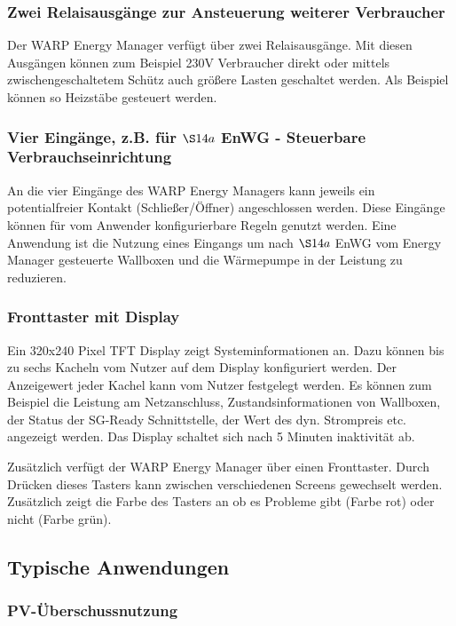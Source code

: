 \documentclass[a4paper,10pt]{article}
\begin{document}
\begin{multicols*}{2}
	\subsubsection{Zwei Relaisausgänge zur Ansteuerung weiterer Verbraucher}
	Der WARP Energy Manager verfügt über zwei Relaisausgänge. 
    Mit diesen Ausgängen können zum Beispiel 230V Verbraucher direkt oder mittels zwischengeschaltetem Schütz auch größere Lasten
    geschaltet werden. Als Beispiel können so Heizstäbe gesteuert werden.

	\subsubsection{Vier Eingänge, z.B. für $\S14a$ EnWG - Steuerbare Verbrauchseinrichtung}
    An die vier Eingänge des WARP Energy Managers kann jeweils ein potentialfreier Kontakt (Schließer/Öffner) angeschlossen werden.
    Diese Eingänge können für vom Anwender konfigurierbare Regeln genutzt werden. Eine Anwendung ist die Nutzung eines Eingangs
    um nach $\S14a$ EnWG vom Energy Manager gesteuerte Wallboxen und die Wärmepumpe in der Leistung zu reduzieren.
    
    \subsubsection{Fronttaster mit Display}
    Ein 320x240 Pixel TFT Display zeigt Systeminformationen an. Dazu können bis zu sechs Kacheln vom Nutzer auf dem Display konfiguriert werden.
    Der Anzeigewert jeder Kachel kann vom Nutzer festgelegt werden. Es können zum Beispiel die Leistung am Netzanschluss, 
    Zustandsinformationen von Wallboxen, der Status der SG-Ready Schnittstelle, der Wert des dyn. Strompreis etc. angezeigt werden.
    Das Display schaltet sich nach 5 Minuten inaktivität ab.
    
    Zusätzlich verfügt der WARP Energy Manager über einen Fronttaster. Durch Drücken dieses Tasters kann zwischen verschiedenen Screens 
    gewechselt werden. Zusätzlich zeigt die Farbe des Tasters an ob es Probleme gibt (Farbe rot) oder nicht (Farbe grün).


    \newpage

	\subsection{Typische Anwendungen}

	\subsubsection{PV-Überschussnutzung}
	\label{pv_ueberschussnutzung}


\end{multicols*}
\end{document}
